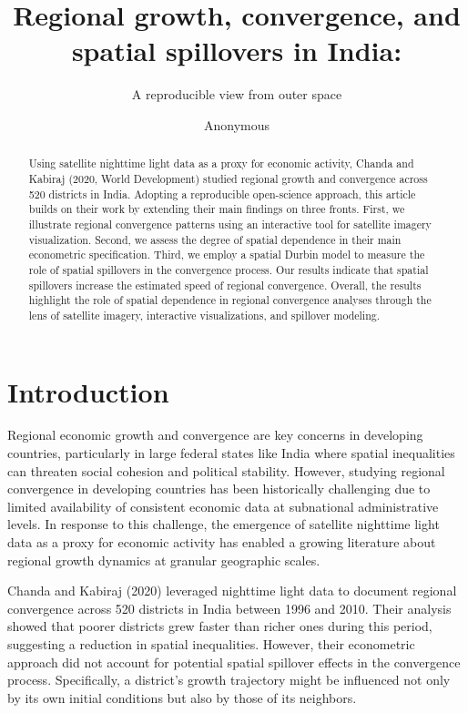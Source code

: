\documentclass[
  letterpaper,
  DIV=11,
  numbers=noendperiod]{scrartcl}
\title{Regional growth, convergence, and spatial spillovers in India:}
\subtitle{A reproducible view from outer space}
\author{Anonymous}
\date{}
\begin{document}
\maketitle
\begin{abstract}
Using satellite nighttime light data as a proxy for economic activity,
Chanda and Kabiraj (2020, World Development) studied regional growth and
convergence across 520 districts in India. Adopting a reproducible
open-science approach, this article builds on their work by extending
their main findings on three fronts. First, we illustrate regional
convergence patterns using an interactive tool for satellite imagery
visualization. Second, we assess the degree of spatial dependence in
their main econometric specification. Third, we employ a spatial Durbin
model to measure the role of spatial spillovers in the convergence
process. Our results indicate that spatial spillovers increase the
estimated speed of regional convergence. Overall, the results highlight
the role of spatial dependence in regional convergence analyses through
the lens of satellite imagery, interactive visualizations, and spillover
modeling.
\end{abstract}


\section{Introduction}\label{introduction}

Regional economic growth and convergence are key concerns in developing
countries, particularly in large federal states like India where spatial
inequalities can threaten social cohesion and political stability.
However, studying regional convergence in developing countries has been
historically challenging due to limited availability of consistent
economic data at subnational administrative levels. In response to this
challenge, the emergence of satellite nighttime light data as a proxy
for economic activity has enabled a growing literature about regional
growth dynamics at granular geographic scales.

Chanda and Kabiraj (2020) leveraged nighttime light data to document
regional convergence across 520 districts in India between 1996 and
2010. Their analysis showed that poorer districts grew faster than
richer ones during this period, suggesting a reduction in spatial
inequalities. However, their econometric approach did not account for
potential spatial spillover effects in the convergence process.
Specifically, a district's growth trajectory might be influenced not
only by its own initial conditions but also by those of its neighbors.
\end{document}
